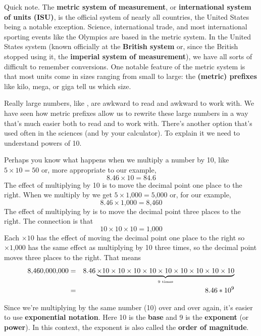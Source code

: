 Quick note.  The \textbf{metric system of measurement}, or \textbf{international system of units (ISU)}, is the official system of nearly all countries, the United States being a notable exception.  Science, international trade, and most international sporting events like the Olympics are based in the metric system.  
In the United States system (known officially at the \textbf{British system} or, since the British stopped using it, the \textbf{imperial system of measurement}), we have all sorts of difficult to remember conversions. 
One notable feature of the metric system is that most units come in sizes ranging from small to large:  the \textbf{(metric) prefixes} like kilo, mega, or giga tell us which size.

Really large numbers, like , are awkward to read and awkward to work with.  We have seen how metric prefixes  allow us to rewrite these large numbers in a way that's much easier both to read and to work with.  There's another option that's used often in the sciences (and by your calculator).  To explain it we need to understand powers of 10.

 Perhaps you know what happens when we multiply a number by 10, like
$ 5 \times 10 = 50$ or, more appropriate to our example, $$ 8.46 \times 10 = 84.6$$
The effect of multiplying by 10 is to move the decimal point one place to the right.
When we multiply by  we get
$ 5 \times \text{1,000} = \text{5,000} $ or, for our example, $$8.46 \times \text{1,000} = \text{8,460}$$
The effect of multiplying by  is to move the decimal point three places to the right.
The connection is that $$10 \times 10 \times 10  =\text{1,000}$$
Each $\times 10$ has the effect of moving the decimal point one place to the right so $\times \text{1,000}$ has the same effect as multiplying by 10 three times, so the decimal point moves three places to the right.
That means 
\begin{eqnarray*}
\text{8,460,000,000} & = & 8.46 \underbrace{\hbox{$\times 10 \times 10  \times 10  \times 10  \times 10  \times 10  \times 10  \times 10  \times 10 $}}_{\hbox{\begin{tiny} 9 times \end{tiny}}}  \\  %
& = & 8.46 \ast 10^ 9 \\  
\end{eqnarray*} 
\vspace{-.5in} %

\noindent Since we're multiplying by the same number (10) over and over again, it's easier to use \textbf{exponential notation}. Here 10 is the \textbf{base} and 9 is the \textbf{exponent} (or \textbf{power}).  In this context, the exponent is also called the \textbf{order of magnitude}. %

